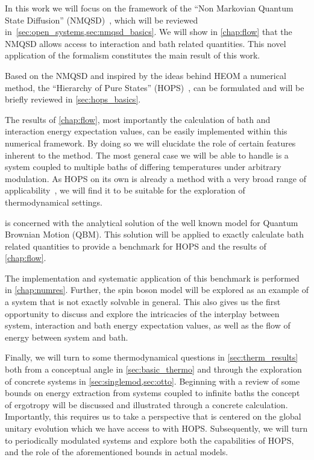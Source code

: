 In this work we will focus on the framework of the ``Non Markovian
Quantum State Diffusion'' (NMQSD)~\cite{Diosi1998Mar}, which will be
reviewed in~\cref{sec:open_systems,sec:nmqsd_basics}. We will show in
\cref{chap:flow} that the NMQSD allows access to interaction and bath
related quantities. This novel application of the formalism
constitutes the main result of this work.

Based on the NMQSD and inspired by the ideas behind HEOM a numerical
method, the ``Hierarchy of Pure States''
(HOPS)~\cite{RichardDiss,Hartmann2017Dec}, can be formulated and will
be briefly reviewed in \cref{sec:hops_basics}.

The results of \cref{chap:flow}, most importantly the calculation of
bath and interaction energy expectation values, can be easily
implemented within this numerical framework. By doing so we will
elucidate the role of certain features inherent to the method. The
most general case we will be able to handle is a system coupled to
multiple baths of differing temperatures under arbitrary
modulation. As HOPS on its own is already a method with a very broad
range of applicability~\cite{RichardDiss}, we will find it to be
suitable for the exploration of thermodynamical settings.

 is concerned with the analytical solution of the
well known model for Quantum Brownian Motion (QBM). This solution will
be applied to exactly calculate bath related quantities to provide a
benchmark for HOPS and the results of \cref{chap:flow}.

The implementation and systematic application of this benchmark is
performed in \cref{chap:numres}. Further, the spin boson model will be
explored as an example of a system that is not exactly solvable in
general. This also gives us the first opportunity to discuss and
explore the intricacies of the interplay between system, interaction
and bath energy expectation values, as well as the flow of energy
between system and bath.

Finally, we will turn to some thermodynamical questions in
\cref{sec:therm_results} both from a conceptual angle in
\cref{sec:basic_thermo} and through the exploration of concrete
systems in \cref{sec:singlemod,sec:otto}. Beginning with a review of
some bounds on energy extraction from systems coupled to infinite
baths the concept of ergotropy will be discussed and illustrated
through a concrete calculation. Importantly, this requires us to take
a perspective that is centered on the global unitary evolution which
we have access to with HOPS.  Subsequently, we will turn to
periodically modulated systems and explore both the capabilities of
HOPS, and the role of the aforementioned bounds in actual models.


